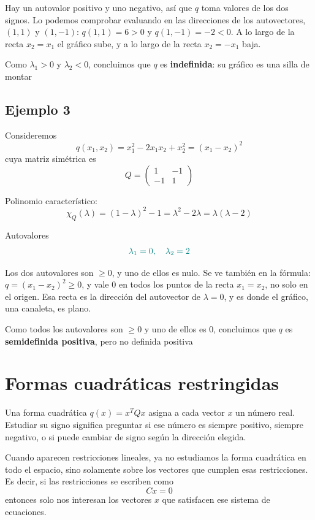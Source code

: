 \documentclass{article}
\begin{document}
Hay un autovalor positivo y uno negativo, así que \(q\) toma valores de los dos signos. Lo podemos comprobar evaluando en las direcciones de los autovectores, \((1,1)\) y \((1,-1)\): \(q(1,1)=6>0\) y \(q(1,-1)=-2<0\). A lo largo de la recta \(x_2=x_1\) el gráfico sube, y a lo largo de la recta \(x_2=-x_1\) baja.

{\color{teal}
Como \(\lambda_1>0\) y \(\lambda_2<0\), concluimos que \(q\) es \textbf{indefinida}: su gráfico es una silla de montar}


\subsection*{Ejemplo 3}

Consideremos
\[
q(x_1,x_2)=x_1^2-2x_1x_2+x_2^2=(x_1-x_2)^2
\]
cuya matriz simétrica es
\[
Q=
\begin{pmatrix}
1 & -1\\
-1 & 1
\end{pmatrix}
\]

Polinomio característico:
\[
\chi_Q(\lambda)=(1-\lambda)^2-1=\lambda^2-2\lambda=\lambda(\lambda-2)
\]

Autovalores
\[\color{teal}
\lambda_1=0,\quad \lambda_2=2
\]

Los dos autovalores son \(\ge0\), y uno de ellos es nulo. Se ve también en la fórmula: \(q=(x_1-x_2)^2\ge0\), y vale \(0\) en todos los puntos de la recta \(x_1=x_2\), no solo en el origen. Esa recta es la dirección del autovector de \(\lambda=0\), y es donde el gráfico, una canaleta, es plano.

{\color{teal}
Como todos los autovalores son \(\ge0\) y uno de ellos es \(0\), concluimos que \(q\) es \textbf{semidefinida positiva}, pero no definida positiva}


\section*{Formas cuadráticas restringidas}

Una forma cuadrática \(q(x)=x^T Q x\) asigna a cada vector \(x\) un número real. Estudiar su signo significa preguntar si ese número es siempre positivo, siempre negativo, o si puede cambiar de signo según la dirección elegida.

Cuando aparecen restricciones lineales, ya no estudiamos la forma cuadrática en todo el espacio, sino solamente sobre los vectores que cumplen esas restricciones. Es decir, si las restricciones se escriben como
\[
C x = 0
\]
entonces solo nos interesan los vectores \(x\) que satisfacen ese sistema de ecuaciones.
\end{document}
